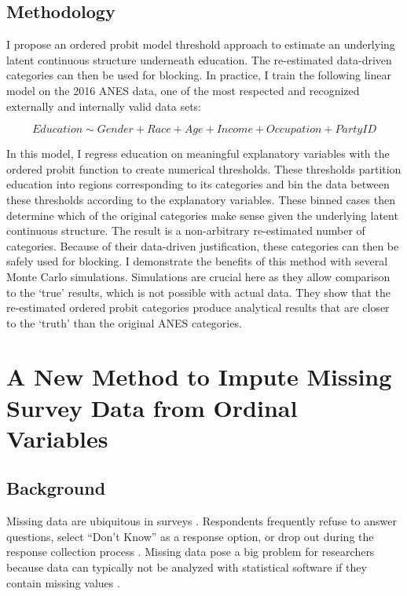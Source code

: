 \documentclass[11pt]{article}
\begin{document}
\subsection{Methodology}

I propose an ordered probit model threshold approach to estimate an underlying latent continuous structure underneath education. The re-estimated data-driven categories can then be used for blocking. In practice, I train the following linear model on the 2016 ANES data, one of the most respected and recognized externally and internally valid data sets:

\vspace{-0.6cm}

\begin{equation}
Education \sim Gender + Race + Age + Income + Occupation + Party ID
\end{equation}

\vspace{-0.2cm}

In this model, I regress education on meaningful explanatory variables with the ordered probit function to create numerical thresholds. These thresholds partition education into regions corresponding to its categories and bin the data between these thresholds according to the explanatory variables. These binned cases then determine which of the original categories make sense given the underlying latent continuous structure. The result is a non-arbitrary re-estimated number of categories. Because of their data-driven justification, these categories can then be safely used for blocking. I demonstrate the benefits of this method with several Monte Carlo simulations. Simulations are crucial here as they allow comparison to the `true' results, which is not possible with actual data. They show that the re-estimated ordered probit categories produce analytical results that are closer to the `truth' than the original ANES categories.
 
 
 

\section{A New Method to Impute Missing Survey Data from Ordinal Variables} 


\subsection{Background}

Missing data are ubiquitous in surveys \citep{allison_2002_missing,raghunathan_2016_missing}. Respondents frequently refuse to answer questions, select ``Don't Know'' as a response option, or drop out during the response collection process \citep{honaker_2010_what}. Missing data pose a big problem for researchers because data can typically not be analyzed with statistical software if they contain missing values \citep{little_2002_statistical,molenberghs_2007_missing}. 
\end{document}
